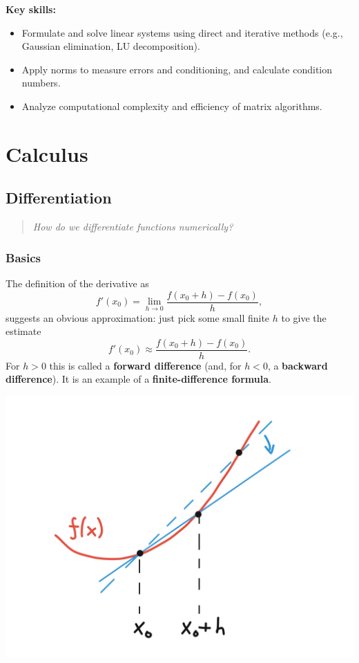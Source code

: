\documentclass[
  letterpaper,
  DIV=11,
  numbers=noendperiod]{scrreprt}
\begin{document}
\textbf{Key skills:}

\begin{itemize}
\item
  Formulate and solve linear systems using direct and iterative methods
  (e.g., Gaussian elimination, LU decomposition).
\item
  Apply norms to measure errors and conditioning, and calculate
  condition numbers.
\item
  Analyze computational complexity and efficiency of matrix algorithms.
\end{itemize}


\chapter{Calculus}\label{calculus}

\section{Differentiation}\label{s-diff}

\begin{quote}
\emph{How do we differentiate functions numerically?}
\end{quote}

\subsection{Basics}\label{basics}

The definition of the derivative as \[
f'(x_0) = \lim_{h\to 0}\frac{f(x_0+h) - f(x_0)}{h},
\] suggests an obvious approximation: just pick some small finite \(h\)
to give the estimate \[
f'(x_0) \approx \frac{f(x_0 + h) - f(x_0)}{h}.
\] For \(h>0\) this is called a \textbf{forward difference} (and, for
\(h<0\), a \textbf{backward difference}). It is an example of a
\textbf{finite-difference formula}.

\begin{center}
\includegraphics[width=0.6\linewidth,height=\textheight,keepaspectratio]{im/diff.jpg}
\end{center}
\end{document}
